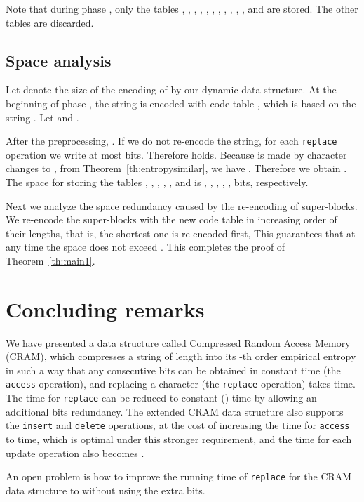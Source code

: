 \documentclass{llncs}
\begin{document}
Note that during phase , only the tables
, , 
, , , 
, , , 
, , 
, and 
are stored.
The other tables are discarded.


\subsection{Space analysis}\label{sec:space}

Let  denote the size of the encoding of  by our dynamic data structure.
At the beginning of phase , the string  is encoded with
code table , which is based on the string .
Let  and .

After the preprocessing,
.
If we do not re-encode the string, for each \texttt{replace} operation we write at most
 bits.  Therefore  holds.
Because  is made by  character changes to ,
from Theorem~\ref{th:entropysimilar}, we have
.
Therefore we obtain
.
The space for storing the tables , , , ,
, and  is
, , ,
,
,
 bits, respectively.

Next we analyze the space redundancy caused by the re-encoding of super-blocks.
We re-encode the super-blocks with the new code table in increasing order of their lengths,
that is, the shortest one is re-encoded first,
This guarantees that
at any time the space does not exceed .
This completes the proof of Theorem~\ref{th:main1}.




\section{Concluding remarks}\label{sec:conclusion}

We have presented a data structure called Compressed Random Access Memory
(CRAM), which compresses a string  of length  into its -th order
empirical entropy in such a way that any consecutive  bits
can be obtained in constant time (the \texttt{access} operation), and
replacing a character (the \texttt{replace} operation) takes
 time.
The time for \texttt{replace} can be reduced to constant
() time
by allowing an additional  bits redundancy.
The extended CRAM data structure also supports the \texttt{insert} and
\texttt{delete} operations, at the cost of increasing the time for
\texttt{access} to  time, which is optimal under
this stronger requirement, and the time for each update operation also
becomes .

An open problem is how to improve the running time of \texttt{replace}
for the CRAM data structure to  without using the
 extra bits.
\end{document}
